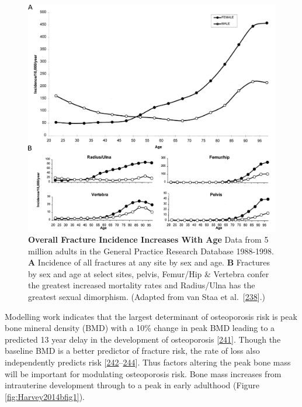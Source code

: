 \documentclass[
]{book}
\begin{document}
\begin{figure}

{\centering \includegraphics[width=0.8\linewidth]{figs/adapted_from_VanStaa2001_Fig1-2} 

}

\caption{\textbf{Overall Fracture Incidence Increases With Age} Data from 5 million adults in the General Practice Research Database 1988-1998. \textbf{A} Incidence of all fractures at any site by sex and age. \textbf{B} Fractures by sex and age at select sites, pelvis, Femur/Hip \& Vertebra confer the greatest increased mortality rates and Radius/Ulna has the greatest sexual dimorphism. (Adapted from van Staa et al.~{[}\protect\hyperlink{ref-VanStaa2001}{238}{]}.)}\label{fig:VanStaa2001}
\end{figure}



Modelling work indicates that the largest determinant of osteoporosis risk is peak bone mineral density (BMD) with a 10\% change in peak BMD leading to a predicted 13 year delay in the development of osteoporosis {[}\protect\hyperlink{ref-Hernandez2003}{241}{]}.
Though the baseline BMD is a better predictor of fracture risk, the rate of loss also independently predicts risk {[}\protect\hyperlink{ref-Nguyen2005}{242}--\protect\hyperlink{ref-Hui1990}{244}{]}.
Thus factors altering the peak bone mass will be important for modulating osteoporosis risk.
Bone mass increases from intrauterine development through to a peak in early adulthood (Figure \ref{fig:Harvey2014bfig1}).
\end{document}
